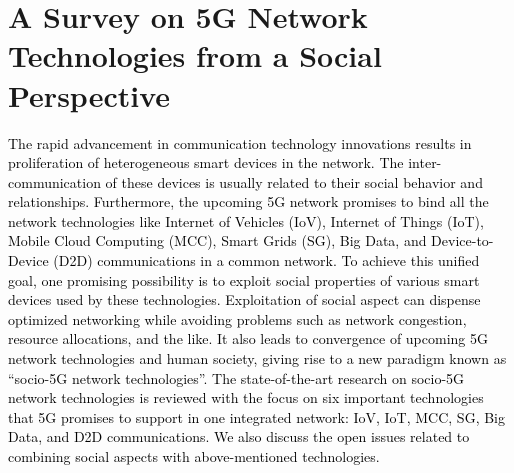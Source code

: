 \section{A Survey on 5G Network Technologies from a Social Perspective}
\textcolor{black}{The rapid advancement in communication technology innovations results in proliferation of heterogeneous smart devices in the network. The inter-communication of these devices is usually related to their social behavior and relationships. Furthermore, the upcoming 5G network promises to bind all the network technologies like Internet of Vehicles (IoV), Internet of Things (IoT), Mobile Cloud Computing (MCC), Smart Grids (SG), Big Data, and Device-to-Device (D2D) communications in a common network. To achieve this unified goal, one promising possibility is to exploit social properties of various smart devices used by these technologies. Exploitation of social aspect can dispense optimized networking while avoiding problems such as network congestion, resource allocations, and the like. It also leads to convergence of upcoming 5G network technologies and human society, giving rise to a new paradigm known as “socio-5G network technologies”. The state-of-the-art research on socio-5G network technologies is reviewed with the focus on six important technologies that 5G promises to support in one integrated network: IoV, IoT, MCC, SG, Big Data, and D2D communications. We also discuss the open issues related to combining social aspects with above-mentioned technologies.}




